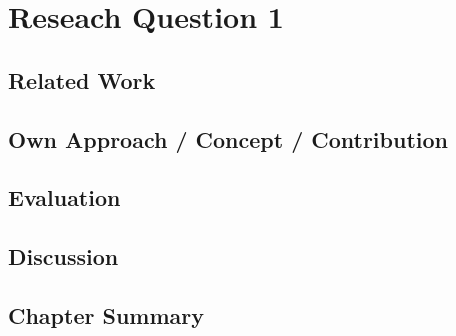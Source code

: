 
\cleardoublepage\chapter{Reseach Question 1}\minitoc\label{sec:concept}\vspace{.5cm}
\noindent\lipsum[7]
\section{Related Work}
\label{sec:concept:relatedwork}
\lipsum[7]
\section{Own Approach / Concept / Contribution}
\label{sec:concept:approach}
\lipsum[7]
\section{Evaluation}
\label{sec:concept:evaluation}
\lipsum[7]

\section{Discussion}
\label{sec:concept:discussion}
\lipsum[7]
\section{Chapter Summary}
\label{sec:concept:summary}
\lipsum[7]
